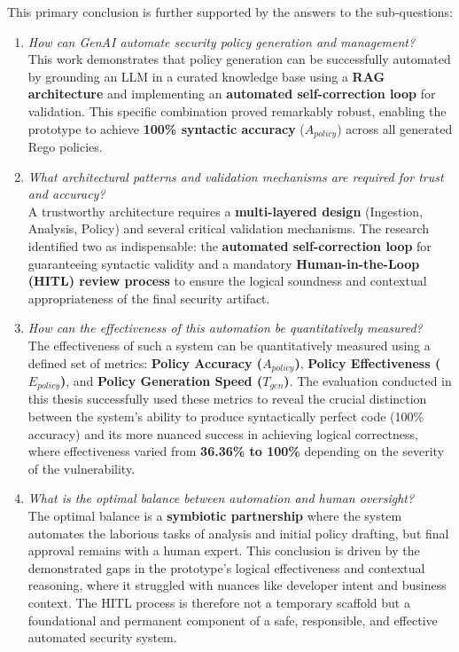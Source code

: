 This primary conclusion is further supported by the answers to the sub-questions:

\begin{enumerate}
    \item \textit{How can GenAI automate security policy generation and management?} \\
    This work demonstrates that policy generation can be successfully automated by grounding an LLM in a curated knowledge base using a \textbf{RAG architecture} and implementing an \textbf{automated self-correction loop} for validation. This specific combination proved remarkably robust, enabling the prototype to achieve \textbf{100\% syntactic accuracy} (\(A_{policy}\)) across all generated Rego policies.

    \item \textit{What architectural patterns and validation mechanisms are required for trust and accuracy?} \\
    A trustworthy architecture requires a \textbf{multi-layered design} (Ingestion, Analysis, Policy) and several critical validation mechanisms. The research identified two as indispensable: the \textbf{automated self-correction loop} for guaranteeing syntactic validity and a mandatory \textbf{Human-in-the-Loop (HITL) review process} to ensure the logical soundness and contextual appropriateness of the final security artifact.

    \item \textit{How can the effectiveness of this automation be quantitatively measured?} \\
    The effectiveness of such a system can be quantitatively measured using a defined set of metrics: \textbf{Policy Accuracy (\(A_{policy}\))}, \textbf{Policy Effectiveness (\(E_{policy}\))}, and \textbf{Policy Generation Speed (\(T_{gen}\))}. The evaluation conducted in this thesis successfully used these metrics to reveal the crucial distinction between the system's ability to produce syntactically perfect code (100\% accuracy) and its more nuanced success in achieving logical correctness, where effectiveness varied from \textbf{36.36\% to 100\%} depending on the severity of the vulnerability.

    \item \textit{What is the optimal balance between automation and human oversight?} \\
    The optimal balance is a \textbf{symbiotic partnership} where the system automates the laborious tasks of analysis and initial policy drafting, but final approval remains with a human expert. This conclusion is driven by the demonstrated gaps in the prototype's logical effectiveness and contextual reasoning, where it struggled with nuances like developer intent and business context. The HITL process is therefore not a temporary scaffold but a foundational and permanent component of a safe, responsible, and effective automated security system.
\end{enumerate}

